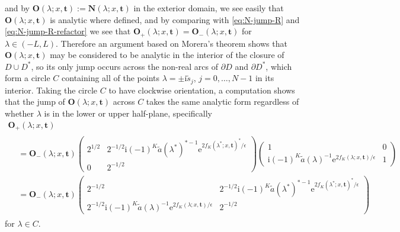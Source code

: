 \documentclass[12pt]{amsart}
\numberwithin{equation}{section}
\newcommand{\ee}{\mathrm{e}}
\newcommand{\ii}{\mathrm{i}}
\newcommand{\SP}{\lambda}
\begin{document}
and by $\mathbf{O}(\SP;x,\mathbf{t}):=\mathbf{N}(\SP;x,\mathbf{t})$ in the exterior domain, we see easily that $\mathbf{O}(\SP;x,\mathbf{t})$ is analytic where defined, and by comparing with \eqref{eq:N-jump-R} and \eqref{eq:N-jump-R-refactor} we see that $\mathbf{O}_+(\SP;x,\mathbf{t})=\mathbf{O}_-(\SP;x,\mathbf{t})$ for $\SP\in (-L,L)$.  Therefore an argument based on Morera's theorem shows that $\mathbf{O}(\SP;x,\mathbf{t})$ may be considered to be analytic in the interior of the closure of $D\cup D^*$, so its only jump occurs across the non-real arcs of $\partial D$ and $\partial D^*$, which form a circle $C$ containing all of the points $\SP=\pm\ii \widetilde{s}_j$, $j=0,\dots,N-1$ in its interior.  Taking the circle $C$ to have clockwise orientation, a computation shows that the jump of $\mathbf{O}(\SP;x,\mathbf{t})$ across $C$ takes the same analytic form regardless of whether $\SP$ is in the lower or upper half-plane, specifically 
\begin{multline}
\mathbf{O}_+(\SP;x,\mathbf{t})\\
\begin{aligned}
&=\mathbf{O}_-(\SP;x,\mathbf{t})\begin{pmatrix}2^{1/2} & 2^{-1/2}\ii (-1)^K\widetilde{a}(\SP^*)^{*-1}\ee^{2f_K(\SP^*;x,\mathbf{t})^*/\epsilon}\\0 & 2^{-1/2}\end{pmatrix}\begin{pmatrix}1 & 0\\
\ii (-1)^K \widetilde{a}(\SP)^{-1}\ee^{2f_K(\SP;x,\mathbf{t})/\epsilon} & 1
\end{pmatrix}\\
&=\mathbf{O}_-(\SP;x,\mathbf{t})\begin{pmatrix}2^{-1/2} & 2^{-1/2}\ii(-1)^K\widetilde{a}(\SP^*)^{*-1}\ee^{2f_K(\SP^*;x,\mathbf{t})^*/\epsilon}\\
2^{-1/2}\ii (-1)^K\widetilde{a}(\SP)^{-1}\ee^{2f_K(\SP;x,\mathbf{t})/\epsilon} & 2^{-1/2}\end{pmatrix}
\end{aligned}
\label{eq:Ojump}
\end{multline}
for $\SP\in C$.
\end{document}
